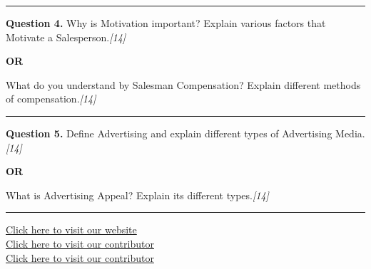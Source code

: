 \documentclass[11pt,a4paper]{article}
\newcommand{\pts}[1]{\hfill   \textit{[#1]}}
\begin{document}
\medskip\rule{\linewidth}{0.2pt}




\noindent   \textbf{Question 4.}
Why is Motivation important? Explain various factors that Motivate a Salesperson.\pts{14}

\centerline{   \textbf{OR}}

What do you understand by Salesman Compensation? Explain different methods of compensation.\pts{14}

\medskip\rule{\linewidth}{0.2pt}




\noindent   \textbf{Question 5.}
Define Advertising and explain different types of Advertising Media.\pts{14}

\centerline{   \textbf{OR}}

What is Advertising Appeal? Explain its different types.\pts{14}

\vfill
\rule{\linewidth}{0.4pt}

\begin{center}\small
\href{https://bhu-exam.vercel.app/}{Click here to visit our website}\\[4pt]
\href{https://me-aryan.vercel.app/}{Click here to visit our contributor}\\[4pt]
\href{https://quashan-me.vercel.app/}{Click here to visit our contributor}
\end{center}
\end{document}
